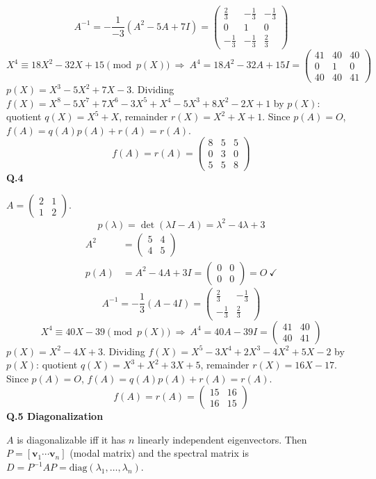 \[ A^{-1}=-\frac{1}{-3}\left(A^{2} -5A +7I\right)=\begin{pmatrix}\frac{2}{3} & - \frac{1}{3} & - \frac{1}{3} \\ 0 & 1 & 0 \\ - \frac{1}{3} & - \frac{1}{3} & \frac{2}{3}\end{pmatrix} \]
\[ X^4\equiv 18 X^{2} - 32 X + 15\pmod{p(X)}\ \Rightarrow\ A^4=18A^{2} - 32A + 15I=\begin{pmatrix}41 & 40 & 40 \\ 0 & 1 & 0 \\ 40 & 40 & 41\end{pmatrix} \]
$p(X)=X^{3} - 5 X^{2} + 7 X - 3$. Dividing $f(X)=X^{8} - 5 X^{7} + 7 X^{6} - 3 X^{5} + X^{4} - 5 X^{3} + 8 X^{2} - 2 X + 1$ by $p(X)$: quotient $q(X)=X^{5} + X$, remainder $r(X)=X^{2} + X + 1$. Since $p(A)=O$, $f(A)=q(A)p(A)+r(A)=r(A)$.
\[ f(A)=r(A)=\begin{pmatrix}8 & 5 & 5 \\ 0 & 3 & 0 \\ 5 & 5 & 8\end{pmatrix} \]
\medskip\noindent\textbf{Q.4}\par\smallskip
$A=\begin{pmatrix}2 & 1 \\ 1 & 2\end{pmatrix}$.
\[ p(\lambda)=\det(\lambda I-A)=\lambda^{2} - 4 \lambda + 3 \]
\begin{align*}
A^2&=\begin{pmatrix}5 & 4 \\ 4 & 5\end{pmatrix} \\
p(A)&=A^{2} - 4A + 3I=\begin{pmatrix}0 & 0 \\ 0 & 0\end{pmatrix}=O\ \checkmark
\end{align*}
\[ A^{-1}=-\frac{1}{3}\left(A -4I\right)=\begin{pmatrix}\frac{2}{3} & - \frac{1}{3} \\ - \frac{1}{3} & \frac{2}{3}\end{pmatrix} \]
\[ X^4\equiv 40 X - 39\pmod{p(X)}\ \Rightarrow\ A^4=40A - 39I=\begin{pmatrix}41 & 40 \\ 40 & 41\end{pmatrix} \]
$p(X)=X^{2} - 4 X + 3$. Dividing $f(X)=X^{5} - 3 X^{4} + 2 X^{3} - 4 X^{2} + 5 X - 2$ by $p(X)$: quotient $q(X)=X^{3} + X^{2} + 3 X + 5$, remainder $r(X)=16 X - 17$. Since $p(A)=O$, $f(A)=q(A)p(A)+r(A)=r(A)$.
\[ f(A)=r(A)=\begin{pmatrix}15 & 16 \\ 16 & 15\end{pmatrix} \]
\medskip\noindent\textbf{Q.5  Diagonalization}\par\smallskip
$A$ is diagonalizable iff it has $n$ linearly independent eigenvectors. Then $P=[\mathbf v_1\cdots\mathbf v_n]$ (modal matrix) and the spectral matrix is $D=P^{-1}AP=\mathrm{diag}(\lambda_1,\dots,\lambda_n)$.

